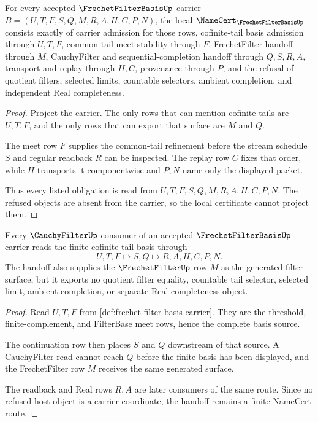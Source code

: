 \begin{theorem}
\label{thm:frechet-filter-basis-namecert-obligations}
For every accepted $\FrechetFilterBasisUp$ carrier $B=(U,T,F,S,Q,M,R,A,H,C,P,N)$, the local $\NameCert_{\FrechetFilterBasisUp}$ consists exactly of carrier admission for those rows, cofinite-tail basis admission through $U,T,F$, common-tail meet stability through $F$, FrechetFilter handoff through $M$, CauchyFilter and sequential-completion handoff through $Q,S,R,A$, transport and replay through $H,C$, provenance through $P$, and the refusal of quotient filters, selected limits, countable selectors, ambient completion, and independent Real completeness.
\end{theorem}
\begin{proof}
Project the carrier. The only rows that can mention cofinite tails are $U,T,F$, and the only rows that can export that surface are $M$ and $Q$.

The meet row $F$ supplies the common-tail refinement before the stream schedule $S$ and regular readback $R$ can be inspected. The replay row $C$ fixes that order, while $H$ transports it componentwise and $P,N$ name only the displayed packet.

Thus every listed obligation is read from $U,T,F,S,Q,M,R,A,H,C,P,N$. The refused objects are absent from the carrier, so the local certificate cannot project them.
\end{proof}

\begin{theorem}
\label{thm:frechet-filter-basis-cauchyfilter-handoff}
Every $\CauchyFilterUp$ consumer of an accepted $\FrechetFilterBasisUp$ carrier reads the finite cofinite-tail basis through
$$
U,T,F \longmapsto S,Q \longmapsto R,A,H,C,P,N .
$$
The handoff also supplies the $\FrechetFilterUp$ row $M$ as the generated filter surface, but it exports no quotient filter equality, countable tail selector, selected limit, ambient completion, or separate Real-completeness object.
\end{theorem}
\begin{proof}
Read $U,T,F$ from \autoref{def:frechet-filter-basis-carrier}. They are the threshold, finite-complement, and FilterBase meet rows, hence the complete basis source.

The continuation row then places $S$ and $Q$ downstream of that source. A CauchyFilter read cannot reach $Q$ before the finite basis has been displayed, and the FrechetFilter row $M$ receives the same generated surface.

The readback and Real rows $R,A$ are later consumers of the same route. Since no refused host object is a carrier coordinate, the handoff remains a finite NameCert route.
\end{proof}

